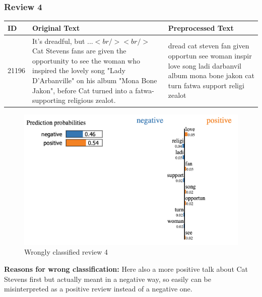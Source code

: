 \newpage
\subsubsection{Review 4}
\begin{tabularx}{\textwidth}{l|X|X}
\textbf{ID} & \textbf{Original Text} & \textbf{Preprocessed Text}\\
\hline
21196 &
It's dreadful, but ...$<br /><br />$Cat Stevens fans are given the opportunity to see the woman who inspired the lovely song "Lady D'Arbanville" on his album "Mona Bone Jakon", before Cat turned into a fatwa-supporting religious zealot.
&
dread cat steven fan given opportun see woman inspir love song ladi darbanvil album mona bone jakon cat turn fatwa support religi zealot
\end{tabularx}

\begin{figure}[htb!]
	\includegraphics[width=\textwidth]{img/review_4}
	\caption{Wrongly classified review 4}
\end{figure}

\textbf{Reasons for wrong classification:}
Here also a more positive talk about Cat Stevens first but actually meant in a negative way, so easily can be misinterpreted as a positive review instead of a negative one.
